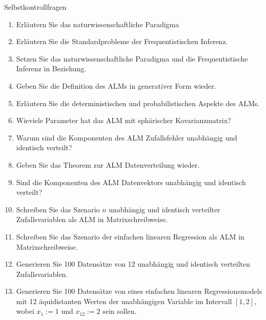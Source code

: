 \documentclass[
  8pt,
  ignorenonframetext,
]{beamer}
\providecommand{\tightlist}{%
  \setlength{\itemsep}{0pt}\setlength{\parskip}{0pt}}
\begin{document}
\begin{frame}{Selbstkontrollfragen}
\protect\hypertarget{selbstkontrollfragen}{}
\footnotesize
{}

\begin{enumerate}
\tightlist
\item
  \justifying Erläutern Sie das naturwissenschaftliche Paradigma
\item
  Erläutern Sie die Standardprobleme der Frequentistischen Inferenz.
\item
  Setzen Sie das naturwissenschaftliche Paradigma und die
  Frequentistische Inferenz in Beziehung.
\item
  Geben Sie die Definition des ALMs in generativer Form wieder.
\item
  Erläutern Sie die deterministischen und probabilistischen Aspekte des
  ALMs.
\item
  Wieviele Parameter hat das ALM mit sphärischer Kovarianzmatrix?
\item
  Warum sind die Komponenten des ALM Zufallsfehler unabhängig und
  identisch verteilt?
\item
  Geben Sie das Theorem zur ALM Datenverteilung wieder.
\item
  Sind die Komponenten des ALM Datenvektors unabhängig und identisch
  verteilt?
\item
  Schreiben Sie das Szenario \(n\) unabhängig und identisch verteilter
  Zufallsvariablen als ALM in Matrixschreibweise.
\item
  Schreiben Sie das Szenario der einfachen linearen Regression als ALM
  in Matrixschreibweise.
\item
  Generieren Sie 100 Datensätze von 12 unabhängig und identisch
  verteilten Zufallsvariablen.
\item
  Generieren Sie 100 Datensätze von eines einfachen linearen
  Regressionsmodels mit 12 äquidistanten Werten der unabhängigen
  Variable im Intervall \([1,2]\), wobei \(x_1 := 1\) und
  \(x_{12} := 2\) sein sollen.
\end{enumerate}
\end{frame}
\end{document}
